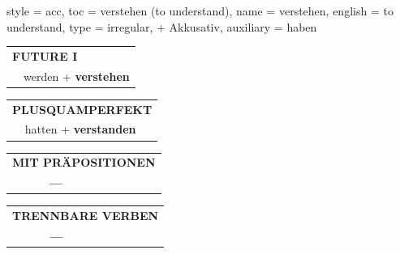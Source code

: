 \begin{verbentry}{
  style = {acc},
  toc = {verstehen (to understand)},
  name = {verstehen},
  english = {to understand},
  type = {irregular, + Akkusativ},
  auxiliary = {haben}
}
\begin{tabular}{rl}
    \multicolumn{2}{l}{\textbf{FUTURE I} }\\
  &  werden + \textbf{verstehen}\\
 
  \end{tabular}
\hfill
   \begin{tabular}{rl}
      \multicolumn{2}{l}{\textbf{PLUSQUAMPERFEKT}}\\
  &  hatten + \textbf{verstanden}\\
  \end{tabular}
  
  
\vspace{10pt}

\begin{tabular}{lll}
\multicolumn{3}{l}{\textbf{MIT PRÄPOSITIONEN}}\\
& \textbf{---} & \\
\end{tabular}
\hfill
\begin{tabular}{lll}
\multicolumn{3}{l}{\textbf{TRENNBARE VERBEN}}\\
& \textbf{---} & \\
\end{tabular}
\vspace{-5pt}
\end{verbentry}

